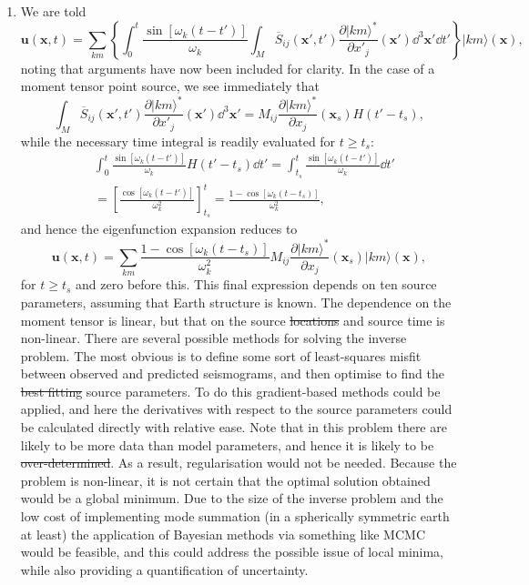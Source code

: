 \documentclass[a4paper,10pt]{paper}
\providecommand{\DIFadd}[1]{{\protect\color{blue}\uwave{#1}}} %
\providecommand{\DIFdel}[1]{{\protect\color{red}\sout{#1}}}                      %
\providecommand{\DIFaddbegin}{} %
\providecommand{\DIFaddend}{} %
\providecommand{\DIFdelbegin}{} %
\providecommand{\DIFdelend}{} %
\begin{document}
\begin{enumerate}
\item We are told
\begin{equation*}
    \mathbf{u}(\mathbf{x},t) = \sum_{km}\left\{\int_{0}^{t}\frac{\sin[\omega_{k}(t-t')]}{\omega_{k}}\int_{M}\overline{S}_{ij}(\mathbf{x}',t')\frac{\partial|km\rangle^{*}}{\partial x'_{j}}(\mathbf{x}')\dd^{3}\mathbf{x}'\dd t'\right\}|km\rangle(\mathbf{x}),
\end{equation*}
noting that arguments have now been included for clarity. In the case of a moment tensor point source, we see immediately that
\begin{equation*}
    \int_{M}\overline{S}_{ij}(\mathbf{x}',t')\frac{\partial|km\rangle^{*}}{\partial x'_{j}}(\mathbf{x}')\dd^{3}\mathbf{x}' = M_{ij}\frac{\partial|km\rangle^{*}}{\partial x_{j}}(\mathbf{x}_{s})H(t'-t_{s}),
\end{equation*}
while the necessary time integral is readily evaluated for $t\ge t_{s}$:
\begin{align*}
    &\int_{0}^{t}\frac{\sin[\omega_{k}(t-t')]}{\omega_{k}}H(t'-t_{s})\dd t' = \int_{t_s}^{t}\frac{\sin[\omega_{k}(t-t')]}{\omega_{k}}\dd t' \\ &= \left[\frac{\cos[\omega_k(t-t')]}{\omega_k^2}\right]_{t_s}^t = \frac{1-\cos[\omega_{k}(t-t_{s})]}{\omega_{k}^{2}},
\end{align*}
and hence the eigenfunction expansion reduces to
\begin{equation*}
    \mathbf{u}(\mathbf{x},t)=\sum_{km}\frac{1-\cos[\omega_{k}(t-t_{s})]}{\omega_{k}^{2}}M_{ij}\frac{\partial|km\rangle^{*}}{\partial x_{j}}(\mathbf{x}_{s})|km\rangle(\mathbf{x}),
\end{equation*}
for $t\ge t_{s}$ and zero before this. This final expression depends on ten source parameters, assuming that Earth structure is known. The dependence on the moment tensor is linear, but that on the source \DIFdelbegin \DIFdel{locations }\DIFdelend \DIFaddbegin \DIFadd{location }\DIFaddend and source time is non-linear. There are several possible methods for solving the inverse problem. The most obvious is to define some sort of least-squares misfit between observed and predicted seismograms, and then optimise to find the \DIFdelbegin \DIFdel{best fitting }\DIFdelend \DIFaddbegin \DIFadd{best-fitting }\DIFaddend source parameters. To do this gradient-based methods could be applied, and here the derivatives with respect to the source parameters could be calculated directly with relative ease. Note that in this problem there are likely to be more data than model parameters, and hence it is likely to be \DIFdelbegin \DIFdel{over-determined}\DIFdelend \DIFaddbegin \DIFadd{overdetermined}\DIFaddend . As a result, regularisation would not be needed. Because the problem is non-linear, it is not certain that the optimal solution obtained would be a global minimum. Due to the size of the inverse problem and the low cost of implementing mode summation (in a spherically symmetric earth \DIFaddbegin \DIFadd{model }\DIFaddend at least) the application of Bayesian methods via something like MCMC would be feasible, and this could address the possible issue of local minima, while also providing a quantification of uncertainty.


\end{enumerate}
\end{document}
